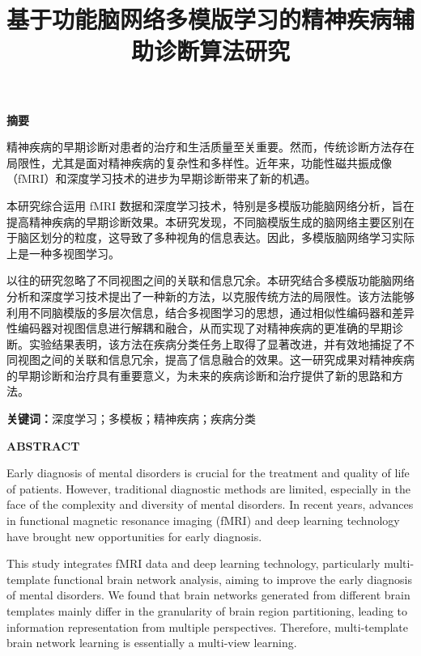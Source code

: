 \documentclass[12pt,a4paper]{article}
\title{基于功能脑网络多模版学习的精神疾病辅助诊断算法研究}
\author{}
\date{}
\begin{document}
\maketitle

\newpage

\begin{center}
\Large
\textbf{摘\quad 要}
\end{center}

精神疾病的早期诊断对患者的治疗和生活质量至关重要。然而，传统诊断方法存在局限性，尤其是面对精神疾病的复杂性和多样性。近年来，功能性磁共振成像（fMRI）和深度学习技术的进步为早期诊断带来了新的机遇。

本研究综合运用 fMRI 数据和深度学习技术，特别是多模版功能脑网络分析，旨在提高精神疾病的早期诊断效果。本研究发现，不同脑模版生成的脑网络主要区别在于脑区划分的粒度，这导致了多种视角的信息表达。因此，多模版脑网络学习实际上是一种多视图学习。

以往的研究忽略了不同视图之间的关联和信息冗余。本研究结合多模版功能脑网络分析和深度学习技术提出了一种新的方法，以克服传统方法的局限性。该方法能够利用不同脑模版的多层次信息，结合多视图学习的思想，通过相似性编码器和差异性编码器对视图信息进行解耦和融合，从而实现了对精神疾病的更准确的早期诊断。实验结果表明，该方法在疾病分类任务上取得了显著改进，并有效地捕捉了不同视图之间的关联和信息冗余，提高了信息融合的效果。这一研究成果对精神疾病的早期诊断和治疗具有重要意义，为未来的疾病诊断和治疗提供了新的思路和方法。

\textbf{关键词：}深度学习；多模板；精神疾病；疾病分类

\newpage

\begin{center}
\Large
\textbf{ABSTRACT}
\end{center}

Early diagnosis of mental disorders is crucial for the treatment and quality of life of patients. However, traditional diagnostic methods are limited, especially in the face of the complexity and diversity of mental disorders. In recent years, advances in functional magnetic resonance imaging (fMRI) and deep learning technology have brought new opportunities for early diagnosis.

This study integrates fMRI data and deep learning technology, particularly multi-template functional brain network analysis, aiming to improve the early diagnosis of mental disorders. We found that brain networks generated from different brain templates mainly differ in the granularity of brain region partitioning, leading to information representation from multiple perspectives. Therefore, multi-template brain network learning is essentially a multi-view learning.
\end{document}
